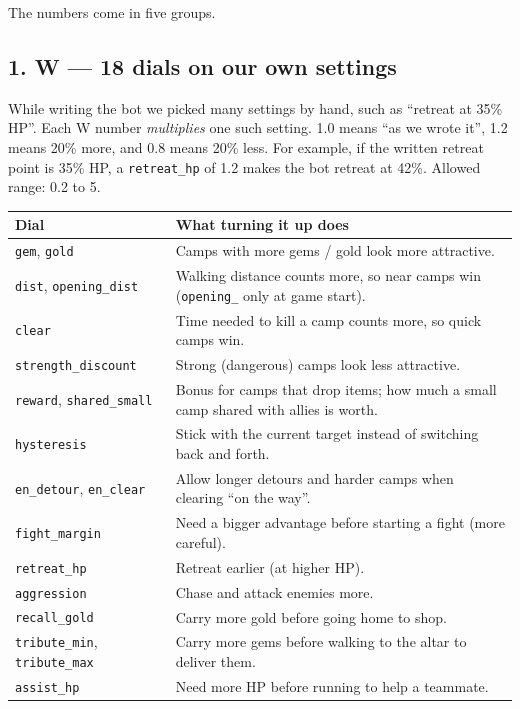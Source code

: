 \documentclass[11pt,a4paper]{article}
\newcommand{\f}[1]{\texttt{#1}}
\begin{document}
The numbers come in five groups.

\subsection*{1. W --- 18 dials on our own settings}
While writing the bot we picked many settings by hand, such as ``retreat at 35\% HP''. Each W number
\emph{multiplies} one such setting. 1.0 means ``as we wrote it'', 1.2 means 20\% more, and 0.8 means
20\% less. For example, if the written retreat point is 35\% HP, a \f{retreat\_hp} of 1.2 makes the
bot retreat at 42\%. Allowed range: 0.2 to 5.

\begin{tabularx}{\linewidth}{@{}lX@{}}
\toprule
Dial & What turning it up does\\
\midrule
\f{gem}, \f{gold} & Camps with more gems / gold look more attractive.\\
\f{dist}, \f{opening\_dist} & Walking distance counts more, so near camps win (\f{opening\_} only at game start).\\
\f{clear} & Time needed to kill a camp counts more, so quick camps win.\\
\f{strength\_discount} & Strong (dangerous) camps look less attractive.\\
\f{reward}, \f{shared\_small} & Bonus for camps that drop items; how much a small camp shared with allies is worth.\\
\f{hysteresis} & Stick with the current target instead of switching back and forth.\\
\f{en\_detour}, \f{en\_clear} & Allow longer detours and harder camps when clearing ``on the way''.\\
\f{fight\_margin} & Need a bigger advantage before starting a fight (more careful).\\
\f{retreat\_hp} & Retreat earlier (at higher HP).\\
\f{aggression} & Chase and attack enemies more.\\
\f{recall\_gold} & Carry more gold before going home to shop.\\
\f{tribute\_min}, \f{tribute\_max} & Carry more gems before walking to the altar to deliver them.\\
\f{assist\_hp} & Need more HP before running to help a teammate.\\
\bottomrule
\end{tabularx}
\end{document}
